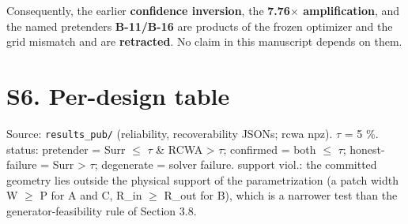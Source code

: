 \documentclass[11pt,a4paper]{article}
\begin{document}
Consequently, the earlier \textbf{confidence inversion}, the \textbf{7.76\ensuremath{\times} amplification},
and the named pretenders \textbf{B-11/B-16} are products of the frozen optimizer and
the grid mismatch and are \textbf{retracted}. No claim in this manuscript depends on
them.

\section*{S6. Per-design table}

Source: \texttt{results\_pub/} (reliability, recoverability JSONs; rcwa npz). \ensuremath{\tau} = 5 \%. status: pretender = Surr \ensuremath{\leq} \ensuremath{\tau} \& RCWA \textgreater{} \ensuremath{\tau}; confirmed = both \ensuremath{\leq} \ensuremath{\tau}; honest-failure = Surr \textgreater{} \ensuremath{\tau}; degenerate = solver failure. support viol.: the committed geometry lies outside the physical support of the parametrization (a patch width W \ensuremath{\geq} P for A and C, R\_in \ensuremath{\geq} R\_out for B), which is a narrower test than the generator-feasibility rule of Section 3.8.
\end{document}

